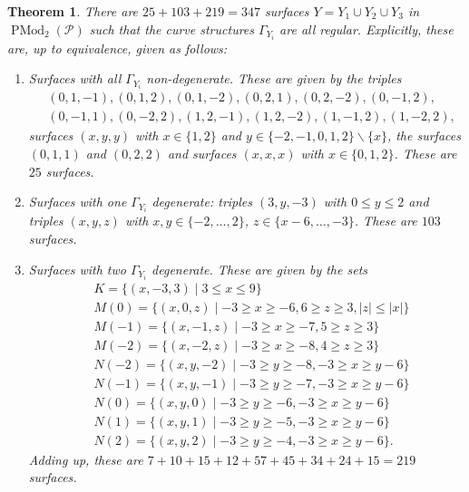 \documentclass[11pt]{amsart}
\numberwithin{equation}{section}
\theoremstyle{plain}
\newtheorem{theorem}{Theorem}[section]
\theoremstyle{remark}
\newcommand{\PMod}{\operatorname{PMod}}
\begin{document}
\begin{theorem}\label{modelsPreg}
There are $25+103+219=347$ surfaces $Y=Y_1\cup Y_2\cup Y_3$ in $\PMod_2(\mathscr{P})$ such that the curve structures $\Gamma_{Y_i}$ are all regular. Explicitly, these are, up to equivalence, given as follows:
\begin{enumerate}
\item\label{modelsPreg-1} Surfaces with all $\Gamma_{Y_i}$ non-degenerate. These are given by the triples
\begin{align*}
&(0,1,-1),(0,1,2),(0,1,-2),(0,2,1),(0,2,-2),(0,-1,2),\\ &(0,-1,1),(0,-2,2),
(1,2,-1),(1,2,-2),(1,-1,2),(1,-2,2),\end{align*}  surfaces $(x,y,y)$ with $x\in \{1,2\}$ and $y\in  \{-2,-1,0,1,2\}\backslash \{x\}$, the surfaces $(0,1,1)$ and $(0,2,2)$ and surfaces $(x,x,x)$ with $x\in\{0,1,2\}$. These are $25$ surfaces.
\item\label{modelsPreg-2} Surfaces with one $\Gamma_{Y_i}$ degenerate: triples $(3,y,-3)$ with $0 \leq  y \leq 2$ and triples $(x,y,z)$ with $x,y \in \{-2,\ldots,2\}$, $z\in \{x-6,\ldots,-3\}$. These are $103$ surfaces.
\item\label{modelsPreg-3} Surfaces with two $\Gamma_{Y_i}$ degenerate. These are given by the sets  
\begin{align*}
&K = \{(x,-3,3) \mid 3 \leq x \leq 9\}\\
&M(0)=\{ (x,0,z) \mid -3\geq x \geq -6, 6\geq z\geq 3, |z| \leq |x| \}\\
&M(-1)=\{ (x,-1,z) \mid -3\geq x \geq -7, 5\geq z\geq 3\}\\ 
&M(-2)=\{ (x,-2,z) \mid -3\geq x \geq -8, 4\geq z\geq 3\}\\
&N(-2)=\{ (x,y,-2) \mid -3\geq y\geq -8 , -3\geq x\geq y-6\}\\
&N(-1)=\{ (x,y,-1) \mid -3\geq y\geq -7, -3\geq x\geq y-6\}\\
&N(0)=\{ (x,y,0) \mid -3\geq y\geq -6, -3\geq x\geq y-6\}\\
&N(1)=\{ (x,y,1) \mid -3\geq y\geq -5, -3\geq x\geq y-6\}\\
&N(2)=\{ (x,y,2) \mid -3\geq y\geq -4, -3\geq x\geq y-6\}.
\end{align*}
Adding up, these are  $7+10+15+12+57+45+34+24+15= 219$ surfaces.
\end{enumerate}
\end{theorem}
\end{document}
